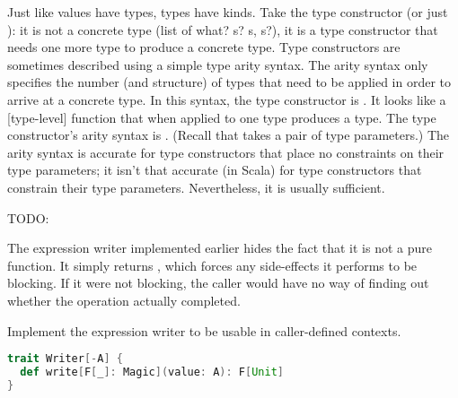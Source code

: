 \documentclass[10 pt]{article}
\begin{document}
Just like values have types, types have kinds. Take the type constructor  (or just ): it is not a concrete type (list of what? s? s, s?), it is a type constructor that needs one more type to produce a concrete type. Type constructors are sometimes described using a simple type arity syntax. The arity syntax only specifies the number (and structure) of types that need to be applied in order to arrive at a concrete type. In this syntax, the  type constructor is \pcode{* -> *}. It looks like a [type-level] function that when applied to one type produces a type. The  type constructor's arity syntax is \pcode{(*, *) -> *}. (Recall that  takes a pair of type parameters.) The arity syntax is accurate for type constructors that place no constraints on their type parameters; it isn't that accurate (in Scala) for type constructors that constrain their type parameters. Nevertheless, it is usually sufficient.

TODO:

The expression writer implemented earlier hides the fact that it is not a pure function. It simply returns , which forces any side-effects it performs to be blocking. If it were not blocking, the caller would have no way of finding out whether the  operation actually completed. 

\begin{example}
Implement the expression writer to be usable in caller-defined contexts.

\begin{lstlisting}[caption={Reader and Writer with proper variance}, label={code:rw2}, language=Scala, escapechar=|]
trait Writer[-A] {
  def write[F[_]: Magic](value: A): F[Unit]
}
\end{lstlisting}
\end{example}


\end{document}
